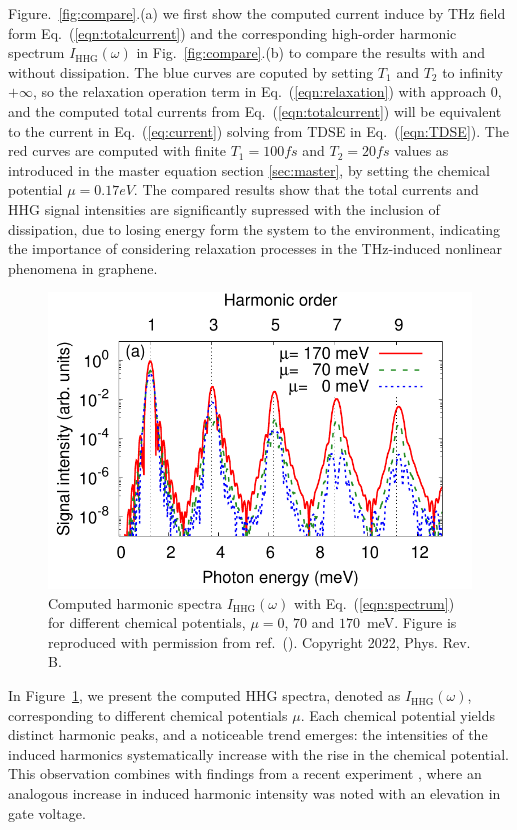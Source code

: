 \color{red}
Figure.~\ref{fig:compare}.(a) we first show the computed current induce by THz field form Eq.~(\ref{eqn:totalcurrent}) and the corresponding high-order harmonic spectrum $I_{\mathrm{HHG}}(\omega)$ in Fig.~\ref{fig:compare}.(b) to compare the results with and without dissipation. The blue curves are coputed by setting $T_1$ and $T_2$ to infinity $+\infty$, so the relaxation operation term in Eq.~(\ref{eqn:relaxation}) with approach 0, and the computed total currents from Eq.~(\ref{eqn:totalcurrent}) will be equivalent to the current in Eq.~(\ref{eq:current}) solving from \gls{TDSE} in Eq.~(\ref{eqn:TDSE}). The red curves are computed with finite $T_1=100 fs$ and $T_2=20 fs$ values as introduced in the master equation section \ref{sec:master}, by setting the chemical potential $\mu = 0.17 eV$. The compared results show that the total currents and \gls{HHG} signal intensities are significantly supressed  with the inclusion of dissipation, due to losing energy form the system to the environment, indicating the importance of considering relaxation processes in the THz-induced nonlinear phenomena in graphene.
\color{black}
\begin{figure}[htbp]
	\centering
	\includegraphics[width=0.8\linewidth]{pic/hhg_mu.pdf}
	\caption{\label{fig:hhg_mu}
		Computed harmonic spectra $I_{\mathrm{HHG}}(\omega)$ with Eq.~(\ref{eqn:spectrum}) for different
		chemical potentials, $\mu = 0$, $70$ and $170$~meV. Figure is reproduced with permission from ref.~(\cite{PhysRevB.106.024313}). Copyright 2022, Phys. Rev. B.}
\end{figure}

In Figure~\ref{fig:hhg_mu}, we present the computed HHG spectra, denoted as $I_{\mathrm{HHG}}(\omega)$, corresponding to different chemical potentials $\mu$. Each chemical potential yields distinct harmonic peaks, and a noticeable trend emerges: the intensities of the induced harmonics systematically increase with the rise in the chemical potential. This observation combines with findings from a recent experiment \cite{kovalev2021electrical}, where an analogous increase in induced harmonic intensity was noted with an elevation in gate voltage.

